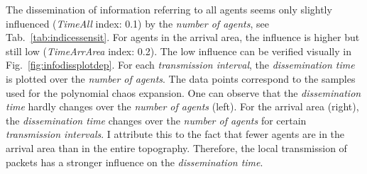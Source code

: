 The dissemination of information referring to all agents seems only slightly influenced (\textit{TimeAll} index: 0.1) by the \textit{number of agents}, see Tab.~\ref{tab:indicessensit}.
For agents in the arrival area, the influence is higher but still low (\textit{TimeArrArea} index: 0.2). The low influence can be verified visually in Fig.~\ref{fig:infodissplotdep}. For each \textit{transmission interval}, the \textit{dissemination time} is plotted over the \textit{number of agents}. The  data points correspond to the samples used for the polynomial chaos expansion. One can observe that the \textit{dissemination time} hardly changes over the \textit{number of agents} (left). For the arrival area (right), the \textit{dissemination time} changes over the \textit{number of agents} for certain \textit{transmission intervals}. I attribute this to the fact that fewer agents are in the arrival area than in the entire topography. Therefore, the local transmission of packets has a stronger influence on the \textit{dissemination time}. 
